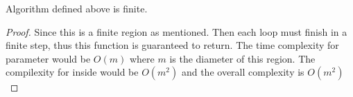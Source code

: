 \begin{theorem}
    Algorithm defined above is finite.
\end{theorem}

\begin{proof}
    Since this is a finite region as mentioned. 
    Then each loop must finish in a finite step, thus this function is guaranteed to return.
    The time complexity for parameter would be $O(m)$ where $m$ is the diameter of this region.
    The compilexity for inside would be $O(m^2)$ and the overall complexity is $O(m^2)$
\end{proof}


